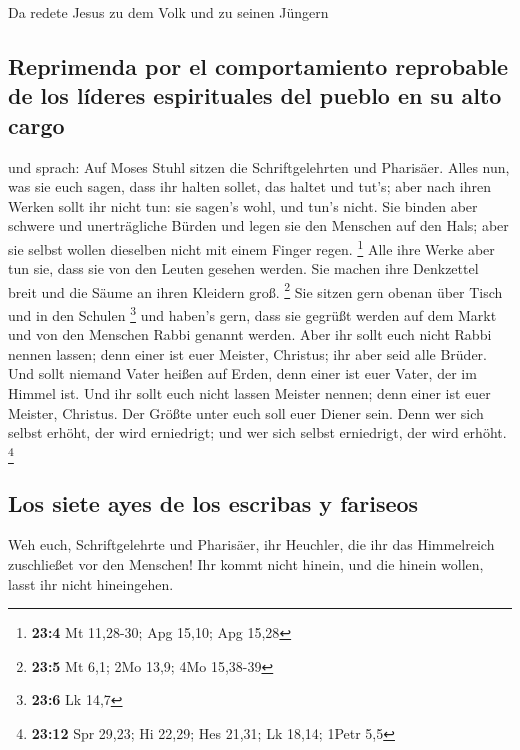  Da redete Jesus zu dem Volk und zu seinen Jüngern

\hypertarget{reprimenda-por-el-comportamiento-reprobable-de-los-luxedderes-espirituales-del-pueblo-en-su-alto-cargo}{%
\subsection{Reprimenda por el comportamiento reprobable de los líderes
espirituales del pueblo en su alto
cargo}\label{reprimenda-por-el-comportamiento-reprobable-de-los-luxedderes-espirituales-del-pueblo-en-su-alto-cargo}}

 und sprach: Auf Moses Stuhl sitzen die Schriftgelehrten
und Pharisäer.  Alles nun, was sie euch sagen, dass ihr
halten sollet, das haltet und tut's; aber nach ihren Werken sollt ihr
nicht tun: sie sagen's wohl, und tun's nicht.  Sie binden
aber schwere und unerträgliche Bürden und legen sie den Menschen auf den
Hals; aber sie selbst wollen dieselben nicht mit einem Finger regen.
\footnote{\textbf{23:4} Mt 11,28-30; Apg 15,10; Apg 15,28}
 Alle ihre Werke aber tun sie, dass sie von den Leuten
gesehen werden. Sie machen ihre Denkzettel breit und die Säume an ihren
Kleidern groß. \footnote{\textbf{23:5} Mt 6,1; 2Mo 13,9; 4Mo 15,38-39}
 Sie sitzen gern obenan über Tisch und in den Schulen
\footnote{\textbf{23:6} Lk 14,7}  und haben's gern, dass
sie gegrüßt werden auf dem Markt und von den Menschen Rabbi genannt
werden.  Aber ihr sollt euch nicht Rabbi nennen lassen;
denn einer ist euer Meister, Christus; ihr aber seid alle Brüder.
 Und sollt niemand Vater heißen auf Erden, denn einer ist
euer Vater, der im Himmel ist.  Und ihr sollt euch nicht
lassen Meister nennen; denn einer ist euer Meister, Christus.
 Der Größte unter euch soll euer Diener sein.
 Denn wer sich selbst erhöht, der wird erniedrigt; und
wer sich selbst erniedrigt, der wird erhöht. \footnote{\textbf{23:12}
  Spr 29,23; Hi 22,29; Hes 21,31; Lk 18,14; 1Petr 5,5}

\hypertarget{los-siete-ayes-de-los-escribas-y-fariseos}{%
\subsection{Los siete ayes de los escribas y
fariseos}\label{los-siete-ayes-de-los-escribas-y-fariseos}}

 Weh euch, Schriftgelehrte und Pharisäer, ihr Heuchler,
die ihr das Himmelreich zuschließet vor den Menschen! Ihr kommt nicht
hinein, und die hinein wollen, lasst ihr nicht hineingehen.

